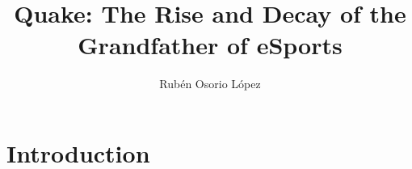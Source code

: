 \documentclass[twocolumn]{article}
\title{Quake: The Rise and Decay of the Grandfather of eSports}
\author{Rubén Osorio López}
\begin{document}
\maketitle

\begin{abstract}

\end{abstract}

\section{Introduction}

\end{document}

